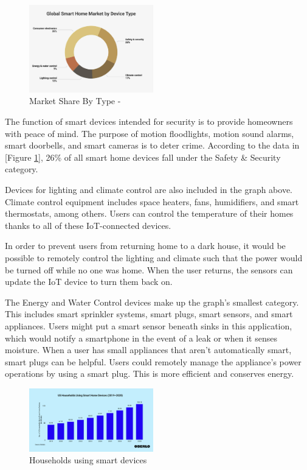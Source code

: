 \documentclass[10pt, journal]{IEEEtran} %
\begin{document}
\begin{figure}[htbp]
    \centering
    \includegraphics[width=0.48\textwidth]{images/share_by_device.png}
    \caption{Market Share By Type - \cite[Mariotti]{Mariotti}}
    \label{fig:sbd}
\end{figure}

The function of smart devices intended for security is to provide homeowners with peace of mind. 
The purpose of motion floodlights, motion sound alarms, smart doorbells, and smart cameras is to deter crime. 
According to the data in [Figure \ref{fig:sbd}], 26\% of all smart home devices fall under the Safety \& Security category. 

Devices for lighting and climate control are also included in the graph above. 
Climate control equipment includes space heaters, fans, humidifiers, and smart thermostats, among others.
Users can control the temperature of their homes thanks to all of these IoT-connected devices.

In order to prevent users from returning home to a dark house, 
it would be possible to remotely control the lighting and climate 
such that the power would be turned off while no one was home.
When the user returns, the sensors can update the IoT device to turn them back on.

The Energy and Water Control devices make up the graph's smallest category. 
This includes smart sprinkler systems, smart plugs, smart sensors, and smart appliances. 
Users might put a smart sensor beneath sinks in this application,
which would notify a smartphone in the event of a leak or when it senses moisture. 
When a user has small appliances that aren't automatically smart, smart plugs can be helpful. 
Users could remotely manage the appliance's power operations by using a smart plug. 
This is more efficient and conserves energy.

\begin{figure}[htbp]
    \centering
    \includegraphics[width=0.48\textwidth]{images/oberlo.png}
    \caption{Households using smart devices \cite[oberlo]{oberlo}}
    \label{fig:oberlo}
\end{figure}
\end{document}
